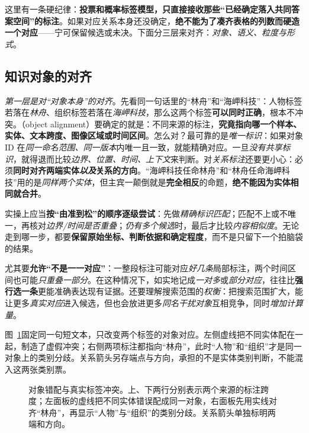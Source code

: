 这里有一条硬纪律：\textbf{投票和概率标签模型，只直接接收那些“已经确定落入共同答案空间”的标注}。如果对应关系本身还没确定，\textbf{绝不能为了凑齐表格的列数而硬造一个对应}——宁可保留候选或未决。下面分三层来对齐：\emph{对象、语义、粒度与形式}。

\subsection{知识对象的对齐}
\label{sec:knowledge-fusion-object-alignment}

\emph{第一层是对“对象本身”的对齐}。先看同一句话里的“林舟”和“海岬科技”：人物标签若落在\emph{林舟}、组织标签若落在\emph{海岬科技}，那么这两个标签\textbf{可以同时正确}，根本不冲突。（object alignment）要确定的就是：不同来源的标注，\textbf{究竟指向哪一个样本、实体、文本跨度、图像区域或时间区间}。怎么对？最可靠的是\emph{唯一标识}：如果对象 ID 在\emph{同一命名范围、同一版本}内唯一且一致，就能精确对应。一旦\emph{没有共享标识}，就得退而比较\emph{边界、位置、时间、上下文}来判断。对\emph{关系标注}还要更小心：必须\textbf{同时对齐两端实体\emph{以及}关系的方向}。“海岬科技任命林舟”和“林舟任命海岬科技”用的是\emph{同样两个实体}，但主宾一颠倒就是\textbf{完全相反}的命题，\textbf{绝不能因为实体相同就合并}。

实操上应当\textbf{按“由准到松”的顺序逐级尝试}：先做\emph{精确标识匹配}；匹配不上或不唯一，再核对\emph{边界/时间是否重叠}；\emph{仍有多个候选}时，最后才比较\emph{内容相似度}。无论走到哪一步，都要\textbf{保留原始坐标、判断依据和确定程度}，而不是只留下一个拍脑袋的结果。

尤其要\textbf{允许“不是一一对应”}：一整段标注可能对应\emph{好几条}局部标注，两个时间区间也可能\emph{只重叠一部分}。在这种情况下，如实地记成\emph{一对多}或\emph{部分对应}，往往比\textbf{强行选一条}更能准确表达现有证据。还要理解搜索范围的\emph{权衡}：把搜索范围扩大，能让更多\emph{真实对应}进入候选，但也会放进更多\emph{同名干扰对象}互相竞争，同时\emph{增加计算量}。

图~\ref{fig:knowledge-fusion-object-alignment}固定同一句短文本，只改变两个标签的对象对应。左侧虚线把不同实体配在一起，制造了虚假冲突；右侧两项标注都指向“林舟”，此时“人物”和“组织”才是同一对象上的类别分歧。关系箭头另存端点与方向，承担的不是实体类别判断，不能混入这两张类别票。

\begin{figure}[htbp]
  \centering
  
  \caption{对象错配与真实标签冲突。上、下两行分别表示两个来源的标注跨度；左面板的虚线把不同实体错误配成同一对象，右面板先用实线对齐“林舟”，再显示“人物”与“组织”的类别分歧。关系箭头单独标明两端和方向。}
  \label{fig:knowledge-fusion-object-alignment}
\end{figure}
\FloatBarrier


